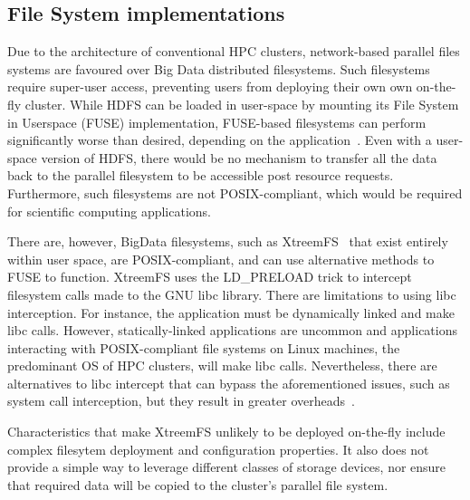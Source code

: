 \subsection{File System implementations}
      Due to the architecture of conventional HPC clusters, network-based
      parallel files systems are favoured over Big Data distributed filesystems.
      Such filesystems require super-user access, preventing users from
      deploying their own own on-the-fly cluster. While HDFS can be loaded in
      user-space by mounting its File System in Userspace (FUSE) implementation,
      FUSE-based filesystems can perform significantly worse than desired,
      depending on the application~\cite{tofuse}. Even with a user-space version
      of HDFS, there would be no mechanism to transfer all the data back to the
      parallel filesystem to be accessible post resource requests. Furthermore,
      such filesystems are not POSIX-compliant, which would be required for
      scientific computing applications.
      
      There are, however, BigData filesystems, such as XtreemFS~\cite{xtreemfs}
      that exist entirely within user space, are POSIX-compliant, and can use
      alternative methods to FUSE to function. XtreemFS uses 
      the LD\_PRELOAD trick to intercept filesystem calls
      made to the GNU libc library. There are limitations to using libc
      interception. For instance, the application must be dynamically linked and
      make libc calls. However, statically-linked applications are uncommon and
      applications interacting with POSIX-compliant file systems on Linux
      machines, the predominant OS of HPC clusters, will make libc calls.
      Nevertheless, there are alternatives to libc intercept that can bypass the
      aforementioned issues, such as system call interception, but they result
      in greater overheads~\cite{quinson}.

      Characteristics that make XtreemFS unlikely to be deployed on-the-fly
      include complex filesytem deployment and configuration properties. It also
      does not provide a simple way to leverage different classes of storage
      devices, nor ensure that required data will be copied to the cluster's
      parallel file system.

